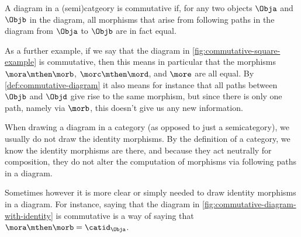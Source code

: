 \begin{marginfigure}
    \centering
    \caption{}
    \label{fig:commutative-diagram-example-prep}
\end{marginfigure}

\begin{marginfigure}
    \centering
    \caption{}
    \label{fig:commutative-diagram-example}
\end{marginfigure}

\begin{marginfigure}
    \centering
    \caption{}
    \label{fig:commutative-square-example}
\end{marginfigure}

\begin{marginfigure}
    \centering
    \caption{}
    \label{fig:commutative-diagram-with-identity}
\end{marginfigure}

\begin{definition}
    \label{def:commutative-diagram}
    A diagram in a (semi)catgeory is commutative if, for any two objects $\Obja$ and $\Objb$ in the diagram, all morphisms that arise from following paths in the diagram from $\Obja$ to $\Objb$ are in fact equal.
\end{definition}

As a further example, if we say that the diagram in \cref{fig:commutative-square-example} is commutative, then this means in particular that the morphisms $\mora \mthen \morb$, $\morc \mthen \mord$, and $\more$ are all equal.
By \cref{def:commutative-diagram} it also means for instance that all paths between $\Objb$ and $\Objd$ give rise to the same morphism, but since there is only one path, namely via $\morb$, this doesn't give us any new information.

\begin{remark}
    When drawing a diagram in a category (as opposed to just a semicategory), we usually do not draw the identity morphisms.
    By the definition of a category, we know the identity morphisms are there, and because they act neutrally for composition, they do not alter the computation of morphisms via following paths in a diagram.

    Sometimes however it is more clear or simply needed to draw identity morphisms in a diagram.
    For instance, saying that the diagram in \cref{fig:commutative-diagram-with-identity} is commutative is a way of saying that $\mora \mthen \morb = \catid_{\Obja}$.
\end{remark}

